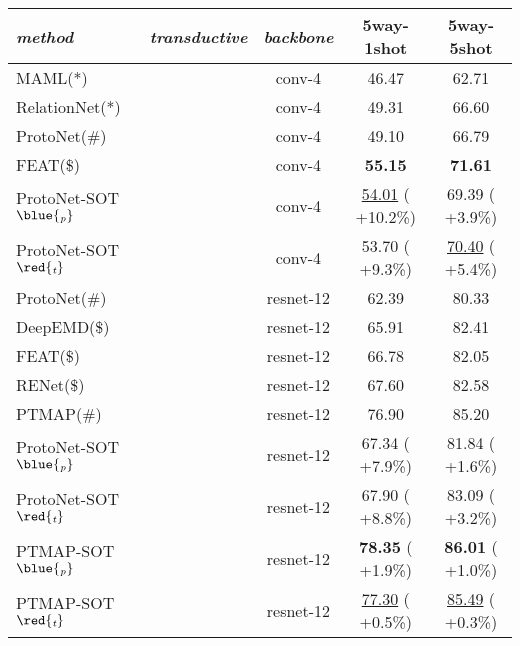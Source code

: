 \newcommand{\bbb}[1]{({\footnotesize \color{blue} #1})}
\newcommand{\rrr}[1]{({\footnotesize \color{red} #1})}
\newcommand{\cmark}{\hspace{-10pt}\ding{51}\hspace{-6pt}}\newcommand{\xmark}{\hspace{-10pt}\ding{55}\hspace{-6pt}}\begin{table}[t]
    \centering \small
    \setlength{\tabcolsep}{0.75em} \begin{tabular}{lcccc}\hline    
    \textit{method}    &  \hspace{-22pt}\textit{transductive}\hspace{-5pt}    &  \footnotesize{\textit{backbone}}  &  \footnotesize{5way-1shot}  &  \footnotesize{5way-5shot}   \\\hline 
    MAML(*)        \cite{finn2017model}& \xmark  & conv-4    &  46.47  &  62.71  \\ 
    RelationNet(*) \cite{sung2018learning}    & \xmark  & conv-4    &  49.31  &  66.60  \\ 
ProtoNet(\#) \cite{snell2017prototypical} & \xmark  & conv-4    &  49.10  &  66.79  \\ 
    FEAT(\$) \cite{ye2020few}   & \xmark  & conv-4 &  \textbf{55.15}  &  \textbf{71.61}  \\ 
\hdashline
    ProtoNet-SOT$\blue{_\textit{p}}$  & \cmark  & conv-4    &  \underline{{54.01}} \bbb{ +10.2\%}  &  69.39 \bbb{+3.9\%}  \\   
    ProtoNet-SOT$\red{_\textit{t}}$  & \cmark  & conv-4    &  53.70 \rrr{+9.3\%}  &  \underline{{70.40}} \rrr{+5.4\%}  \\    
\hline
    ProtoNet(\#) \cite{snell2017prototypical} & \xmark  & resnet-12 &  62.39  &  80.33  \\ 
    DeepEMD(\$) \cite{DeepEMD}    & \xmark  & resnet-12 &  65.91  &  82.41  \\
    FEAT(\$)    \cite{ye2020few}  & \xmark  & resnet-12 &  66.78  &  82.05  \\
    RENet(\$)   \cite{ReNet}      & \xmark  & resnet-12 &  67.60  &  82.58  \\
    PTMAP(\#) \cite{hu2020leveraging}  & \cmark  & resnet-12 &  76.90  &  85.20  \\ 
\hdashline
    ProtoNet-SOT$\blue{_\textit{p}}$  & \cmark  & resnet-12 &  67.34  \bbb{+7.9\%}  & 81.84 \bbb{+1.6\%} \\   
    ProtoNet-SOT$\red{_\textit{t}}$  & \cmark  & resnet-12 &  67.90 \rrr{+8.8\%}  &  83.09 \rrr{+3.2\%}  \\
    PTMAP-SOT$\blue{_\textit{p}}$     & \cmark  & resnet-12 &  \textbf{78.35} \bbb{+1.9\%}  &  \textbf{86.01} \bbb{+1.0\%}  \\   
    PTMAP-SOT$\red{_\textit{t}}$     & \cmark  & resnet-12 &  \underline{{77.30}} \rrr{+0.5\%}  &  \underline{{85.49}} \rrr{+0.3\%}  \\    
    \hline


\end{tabular}
\end{table}
